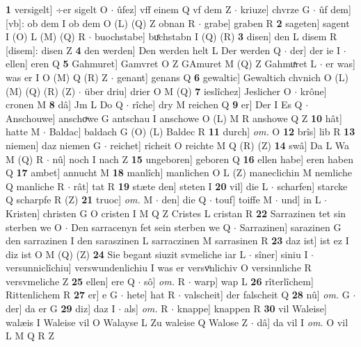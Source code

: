 \documentclass[8pt,a4paper,notitlepage]{article}
\begin{document}
\begin{table}[ht]
\begin{minipage}[t]{0.5\linewidth}
\textbf{1} versigelt] ÷er sigelt O  $\cdot$ ûfez] vff einem Q vf dem Z  $\cdot$ kriuze] chvrze G  $\cdot$ ûf dem] [vb]: ob dem I ob dem O (L) (Q) Z obnan R  $\cdot$ grabe] graben R \textbf{2} sageten] sagent I (O) L (M) (Q) R  $\cdot$ buochstabe] buͤchstabn I (Q) (R) \textbf{3} disen] den L disem R [disem]: disen Z \textbf{4} den werden] Den werden helt L Der werden Q  $\cdot$ der] der ie I  $\cdot$ ellen] eren Q \textbf{5} Gahmuret] Gamvret O Z GAmuret M (Q) Z Gahmuͯret L  $\cdot$ er was] was er I O (M) Q (R) Z  $\cdot$ genant] genans Q \textbf{6} gewaltic] Gewaltich chvnich O (L) (M) (Q) (R) (Z)  $\cdot$ über driu] drier O M (Q) \textbf{7} ieslîchez] Jeslicher O  $\cdot$ krône] cronen M \textbf{8} dâ] Jm L Do Q  $\cdot$ rîche] dry M reichen Q \textbf{9} er] Der I Es Q  $\cdot$ Anschouwe] anschoͮwe G antschau I anschowe O (L) M R anshowe Q Z \textbf{10} hât] hatte M  $\cdot$ Baldac] baldach G (O) (L) Baldec R \textbf{11} durch] \textit{om.} O \textbf{12} brîs] lib R \textbf{13} niemen] daz niemen G  $\cdot$ reichet] richeit O reichte M Q (R) (Z) \textbf{14} swâ] Da L Wa M (Q) R  $\cdot$ nû] noch I nach Z \textbf{15} ungeboren] geboren Q \textbf{16} ellen habe] eren haben Q \textbf{17} ambet] annucht M \textbf{18} manlîch] manlichen O L (Z) maneclichin M nemliche Q manliche R  $\cdot$ rât] tat R \textbf{19} stæte den] steten I \textbf{20} vil] die L  $\cdot$ scharfen] starcke Q scharpfe R (Z) \textbf{21} truoc] \textit{om.} M  $\cdot$ den] die Q  $\cdot$ touf] toiffe M  $\cdot$ und] in L  $\cdot$ Kristen] christen G O cristen I M Q Z Cristes L cristan R \textbf{22} Sarrazinen tet sin sterben we O  $\cdot$ Den sarracenyn fet sein sterben we Q  $\cdot$ Sarrazinen] sarazinen G den sarrazinen I den saraszinen L sarraczinen M sarrasinen R \textbf{23} daz ist] ist ez I diz ist O M (Q) (Z) \textbf{24} Sie begant siuzit svmeliche iar L  $\cdot$ sîner] siniu I  $\cdot$ versunniclîchiu] verswundenlichiu I was er versvͦnlichiv O versinnliche R versvmeliche Z \textbf{25} ellen] ere Q  $\cdot$ sô] \textit{om.} R  $\cdot$ warp] wap L \textbf{26} rîterlîchem] Rittenlichem R \textbf{27} er] e G  $\cdot$ hete] hat R  $\cdot$ valscheit] der falscheit Q \textbf{28} nû] \textit{om.} G  $\cdot$ der] da er G \textbf{29} diz] daz I  $\cdot$ als] \textit{om.} R  $\cdot$ knappe] knappen R \textbf{30} vil Waleise] walæis I Waleise vil O Walayse L Zu waleise Q Walose Z  $\cdot$ dâ] da vil I \textit{om.} O vil L M Q R Z \newline
\end{minipage}
\hspace{0.5cm}
\begin{minipage}[t]{0.5\linewidth}

\end{minipage}
\end{table}
\end{document}
